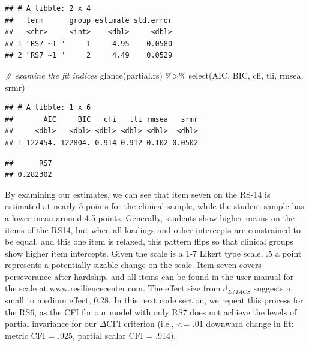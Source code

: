 \documentclass[
  man]{apa7}
\newenvironment{Shaded}{\begin{snugshade}}{\end{snugshade}}
\newcommand{\CommentTok}[1]{\textcolor[rgb]{0.56,0.35,0.01}{\textit{#1}}}
\newcommand{\DecValTok}[1]{\textcolor[rgb]{0.00,0.00,0.81}{#1}}
\newcommand{\FunctionTok}[1]{\textcolor[rgb]{0.00,0.00,0.00}{#1}}
\newcommand{\NormalTok}[1]{#1}
\newcommand{\SpecialCharTok}[1]{\textcolor[rgb]{0.00,0.00,0.00}{#1}}
\newcommand{\StringTok}[1]{\textcolor[rgb]{0.31,0.60,0.02}{#1}}
\begin{document}
\begin{verbatim}
## # A tibble: 2 x 4
##   term      group estimate std.error
##   <chr>     <int>    <dbl>     <dbl>
## 1 "RS7 ~1 "     1     4.95    0.0580
## 2 "RS7 ~1 "     2     4.49    0.0529
\end{verbatim}

\small

\begin{Shaded}
\begin{Highlighting}[]
\CommentTok{\# examine the fit indices }
\FunctionTok{glance}\NormalTok{(partial.rs) }\SpecialCharTok{\%\textgreater{}\%} 
  \FunctionTok{select}\NormalTok{(AIC, BIC, cfi, tli, rmsea, srmr)}
\end{Highlighting}
\end{Shaded}

\normalsize

\begin{verbatim}
## # A tibble: 1 x 6
##       AIC     BIC   cfi   tli rmsea   srmr
##     <dbl>   <dbl> <dbl> <dbl> <dbl>  <dbl>
## 1 122454. 122804. 0.914 0.912 0.102 0.0502
\end{verbatim}

\small

\begin{Shaded}
\end{Shaded}

\normalsize

\begin{verbatim}
##      RS7 
## 0.282302
\end{verbatim}

By examining our estimates, we can see that item seven on the RS-14 is estimated at nearly 5 points for the clinical sample, while the student sample has a lower mean around 4.5 points. Generally, students show higher means on the items of the RS14, but when all loadings and other intercepts are constrained to be equal, and this one item is relaxed, this pattern flips so that clinical groups show higher item intercepts. Given the scale is a 1-7 Likert type scale, .5 a point represents a potentially sizable change on the scale. Item seven covers perseverance after hardship, and all items can be found in the user manual for the scale at www.resiliencecenter.com. The effect size from \(d_{DMACS}\) suggests a small to medium effect, 0.28. In this next code section, we repeat this process for the RS6, as the CFI for our model with only RS7 does not achieve the levels of partial invariance for our \(\Delta\)CFI criterion (i.e., \textless= .01 downward change in fit: metric CFI = .925, partial scalar CFI = .914).
\end{document}
